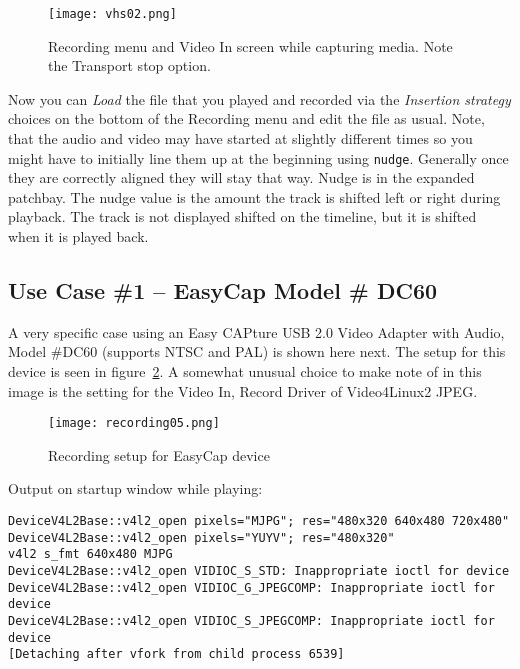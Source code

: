\begin{figure}[htpb]
    \centering
    \texttt{[image: vhs02.png]}
    \caption{Recording menu and Video In screen while capturing media.  Note the Transport stop option.}
    \label{fig:vhs02}
\end{figure}

Now you can \textit{Load} the file that you played and recorded via the \textit{Insertion strategy} choices on the bottom of the Recording menu and edit the file as usual.  Note, that the audio and video may have started at slightly different times so you might have to initially line them up at the beginning using \texttt{nudge}.  Generally once they are correctly aligned they will stay that way.  Nudge is in the expanded patchbay. The nudge value is the amount the track is shifted left or right during playback. The track is not displayed shifted on the timeline, but it is shifted when it is played back.

\subsection{Use Case \#1 – EasyCap Model \# DC60}
\label{sub:use_case_easycap_model_dc60}

A very specific case using an Easy CAPture USB 2.0 Video Adapter with Audio, Model \#DC60 (supports
NTSC and PAL) is shown here next. The setup for this device is seen in figure~\ref{fig:recording-usb}.
A somewhat unusual choice to make note of in this image is the setting for the Video In, Record Driver
of Video4Linux2 JPEG. 

\begin{figure}[htpb]
    \centering
    \texttt{[image: recording05.png]}
    \caption{Recording setup for EasyCap device}
    \label{fig:recording-usb}
\end{figure}

Output on startup window while playing:
\begin{lstlisting}[style=sh]
DeviceV4L2Base::v4l2_open pixels="MJPG"; res="480x320 640x480 720x480"
DeviceV4L2Base::v4l2_open pixels="YUYV"; res="480x320"
v4l2 s_fmt 640x480 MJPG
DeviceV4L2Base::v4l2_open VIDIOC_S_STD: Inappropriate ioctl for device
DeviceV4L2Base::v4l2_open VIDIOC_G_JPEGCOMP: Inappropriate ioctl for device
DeviceV4L2Base::v4l2_open VIDIOC_S_JPEGCOMP: Inappropriate ioctl for device
[Detaching after vfork from child process 6539]
\end{lstlisting}

